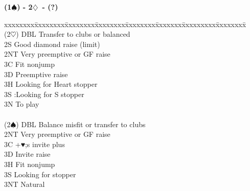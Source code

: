 \documentclass[10pt]{article}
\renewcommand{\d}{$\diamondsuit$}
\newcommand{\h}{$\heartsuit$}
\newcommand{\s}{$\spadesuit$}
\newenvironment{bidtable}[1][]
{\textbf{#1}
  \begin{adjustwidth}{1em}{}
    \addvspace{2pt}
    \begin{tabbing}
      xxxxxxxx\=xxxxxxxx\=xxxxxxxx\=xxxxxxxx\=xxxxxxxx\=xxxxxxx\=xxxxxxxxx\=xxxxxxxx\=\kill}
{\end{tabbing}\end{adjustwidth}\bigskip}%
\begin{document}
\begin{bidtable}[(1\s) - 2\d\ - (?)]
                                                                                                       \\
(2\h)  \> DBL  \> Transfer to clubs or balanced                                                        \\
       \> 2S   \> Good diamond raise (limit)                                                           \\
       \> 2NT  \> Very preemptive or GF raise                                                          \\
       \> 3C   \> Fit nonjump                                                                          \\
       \> 3D   \> Preemptive raise                                                                     \\
       \> 3H   \> Looking for Heart stopper                                                            \\
       \> 3S   \> :Looking for S stopper                                                               \\
       \> 3N   \> To play                                                                              \\
                                                                                                       \\
(2\s)  \> DBL  \> Balance misfit or transfer to clubs                                                  \\
       \> 2NT  \> Very preemptive or GF raise                                                          \\
       \> 3C   +♥;s invite plus                                                                    \\
       \> 3D   \> Invite raise                                                                         \\
       \> 3H   \> Fit nonjump                                                                          \\
       \> 3S   \> Looking for stopper                                                                  \\
       \> 3NT  \> Natural
\end{bidtable}
\end{document}
